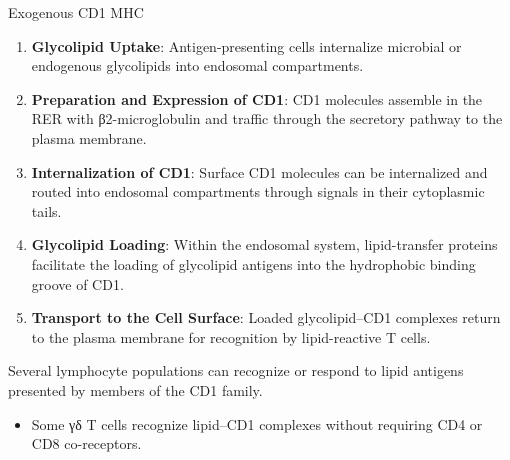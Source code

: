     \begin{core}[label=core:exogenous_cd1mhc]{Exogenous CD1 MHC}

      \begin{enumerate}[label=(\arabic*)]

        \item \textbf{Glycolipid Uptake}: Antigen-presenting cells internalize microbial or endogenous glycolipids into endosomal compartments.

        \item \textbf{Preparation and Expression of CD1}: CD1 molecules assemble in the RER with β2-microglobulin and traffic through the secretory pathway to the plasma membrane.

        \item \textbf{Internalization of CD1}: Surface CD1 molecules can be internalized and routed into endosomal compartments through signals in their cytoplasmic tails.

        \item \textbf{Glycolipid Loading}: Within the endosomal system, lipid-transfer proteins facilitate the loading of glycolipid antigens into the hydrophobic binding groove of CD1.

        \item \textbf{Transport to the Cell Surface}: Loaded glycolipid--CD1 complexes return to the plasma membrane for recognition by lipid-reactive T cells.

      \end{enumerate}

      Several lymphocyte populations can recognize or respond to lipid antigens presented by members of the CD1 family.

      \begin{itemize}

        \item Some γδ T cells recognize lipid--CD1 complexes without requiring CD4 or CD8 co-receptors.


\end{itemize}
\end{core}
